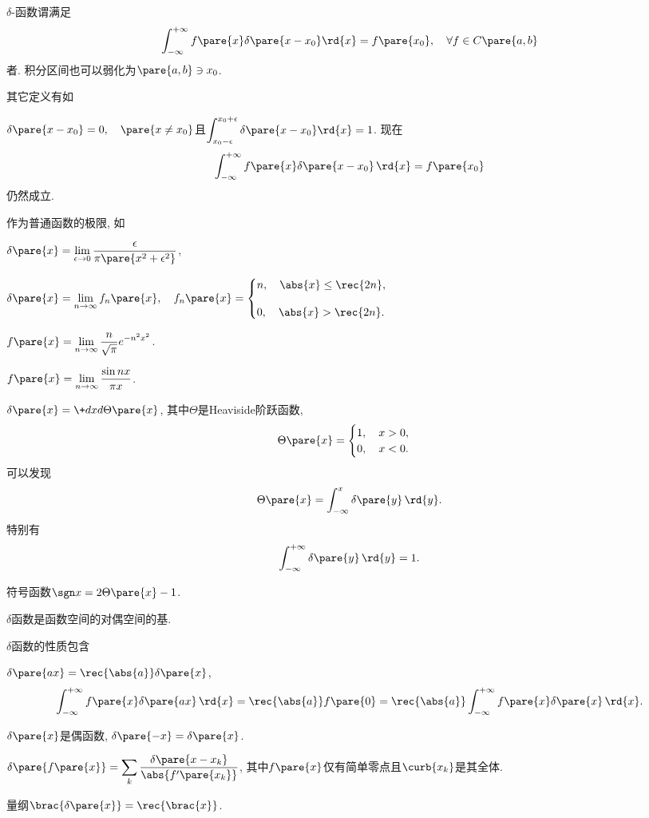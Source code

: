 \documentclass[hidelinks]{ctexart}
\begin{document}
$\delta$-函数谓满足
\[ \int_{-\infty}^{+\infty}f\pare{x} \delta\pare{x-x_0} \rd{x} = f\pare{x_0},\quad \forall f\in C\pare{a,b} \]
者. 积分区间也可以弱化为$\pare{a,b} \ni x_0$.
\par
其它定义有如
\begin{cenum}
    \item $\delta\pare{x-x_0} = 0,\quad \pare{x\neq x_0}$且$\displaystyle \int_{x_0 - \epsilon}^{x_0+\epsilon} \delta\pare{x-x_0} \rd{x} = 1$. 现在
    \[ \int_{-\infty}^{+\infty} f\pare{x}\delta\pare{x-x_0}\,\rd{x} = f\pare{x_0} \]
    仍然成立.
    \item 作为普通函数的极限, 如
    \begin{cenum}
        \item $\displaystyle \delta\pare{x} = \lim_{\epsilon\rightarrow 0} \frac{\epsilon}{\pi\pare{x^2+\epsilon^2}}$,
        \item $\displaystyle \delta\pare{x} = \lim_{n\rightarrow \infty}f_n\pare{x},\quad f_n\pare{x} = \begin{cases}
            \displaystyle n,\quad \abs{x} \le \rec{2n}, \\[1em]
            \displaystyle 0,\quad \abs{x} > \rec{2n}.
        \end{cases}$
        \item $\displaystyle f\pare{x} = \lim_{n\rightarrow \infty} \frac{n}{\sqrt{\pi}}e^{-n^2x^2}$.
        \item $\displaystyle f\pare{x} = \lim_{n\rightarrow \infty} \frac{\sin nx}{\pi x}$.
    \end{cenum}
    \item $\displaystyle \delta\pare{x} = \+dxd{\Theta\pare{x}}$, 其中$\Theta$是Heaviside阶跃函数,
    \[ \Theta\pare{x} = \begin{cases}
        1,\quad x>0,\\
        0,\quad x<0.
    \end{cases} \]
    可以发现
    \[ \Theta\pare{x} = \int_{-\infty}^{x} \delta\pare{y} \,\rd{y}. \]
    特别有
    \[ \int_{-\infty}^{+\infty}\delta\pare{y}\,\rd{y} = 1. \]
\end{cenum}
\begin{remark}
    符号函数$\displaystyle \sgn x = 2\Theta\pare{x} - 1$.
\end{remark}
\begin{remark}
    $\delta$函数是函数空间的对偶空间的基.
\end{remark}
$\delta$函数的性质包含
\begin{cenum}
    \item $\displaystyle \delta\pare{ax} = \rec{\abs{a}} \delta\pare{x}$,
    \[ \int_{-\infty}^{+\infty} f\pare{x} \delta\pare{ax} \,\rd{x} = \rec{\abs{a}}f\pare{0} = \rec{\abs{a}} \int_{-\infty}^{+\infty} f\pare{x}\delta\pare{x}\,\rd{x}. \]
    \item $\delta\pare{x}$是偶函数, $\delta\pare{-x} = \delta\pare{x}$.
    \item $\displaystyle \delta\pare{f\pare{x}} = \sum_k \frac{\delta\pare{x-x_k}}{\abs{f'\pare{x_k}}}$, 其中$f\pare{x}$仅有简单零点且$\curb{x_k}$是其全体.
    \item 量纲$\displaystyle \brac{\delta\pare{x}} = \rec{\brac{x}}$.
\end{cenum}
\end{document}
